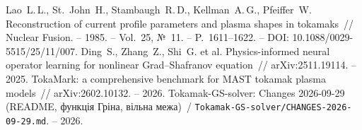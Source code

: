  Lao~L.\,L., St.~John~H., Stambaugh~R.\,D., Kellman~A.\,G., Pfeiffer~W. Reconstruction of current profile parameters and plasma shapes in tokamaks~// Nuclear Fusion. -- 1985. -- Vol.~25, №~11. -- P.~1611--1622. -- DOI: 10.1088/0029-5515/25/11/007.
 Ding~S., Zhang~Z., Shi~G. et al. Physics-informed neural operator learning for nonlinear Grad--Shafranov equation~// arXiv:2511.19114. -- 2025.
 TokaMark: a comprehensive benchmark for MAST tokamak plasma models~// arXiv:2602.10132. -- 2026.
 Tokamak-GS-solver: Changes 2026-09-29 (README, функція Гріна, вільна межа)~/ \texttt{Tokamak-GS-solver/CHANGES-2026-09-29.md}. -- 2026.
